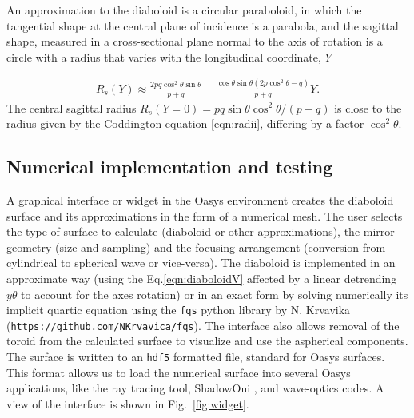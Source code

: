 \documentclass{iucr}       %
\begin{document}


An approximation to the diaboloid is a circular paraboloid, in which the tangential shape at the central plane of incidence is a parabola, and the sagittal shape, measured in a cross-sectional plane normal to the axis of rotation is a circle with a radius that varies with the longitudinal coordinate, $Y$ \cite{part2}

\begin{multline}
\label{eq:sagRadius}
R_s(Y) 
\approx 
\frac{2p q \cos^2\theta \sin\theta }{p + q} - 
\frac{\cos\theta \sin\theta (2 p \cos^2\theta - q)}{p + q} Y.
\end{multline}
The central sagittal radius $R_s(Y=0)=p q \sin\theta \cos^2\theta/ (p+q)$ is close to the radius given by the Coddington equation \ref{eqn:radii}, differing by a factor $\cos^2\theta$.


\subsection{Numerical implementation and testing}
\label{sec:oasys}

A graphical interface or widget in the Oasys environment creates the diaboloid surface and its approximations in the form of a numerical mesh. The user selects the type of surface to calculate (diaboloid or other approximations), the mirror geometry (size and sampling) and the focusing arrangement (conversion from cylindrical to spherical wave or vice-versa). 
The diaboloid is implemented in an approximate way (using the Eq.\ref{eqn:diaboloidV} affected by a linear detrending $y\theta$ to account for the axes rotation) or in an exact form by solving numerically its implicit quartic equation using the {\tt fqs} python library by N. Krvavika ({\tt https://github.com/NKrvavica/fqs}). 
The interface also allows removal of the toroid from the calculated surface to visualize and use the aspherical components. The surface is written to an {\tt hdf5} formatted file, standard for Oasys surfaces. This format allows us to load the numerical surface into several Oasys applications, like the ray tracing tool, ShadowOui \cite{codeSHADOWOUI}, and wave-optics codes. A view of the interface is shown in Fig.~\ref{fig:widget}.
\end{document}
